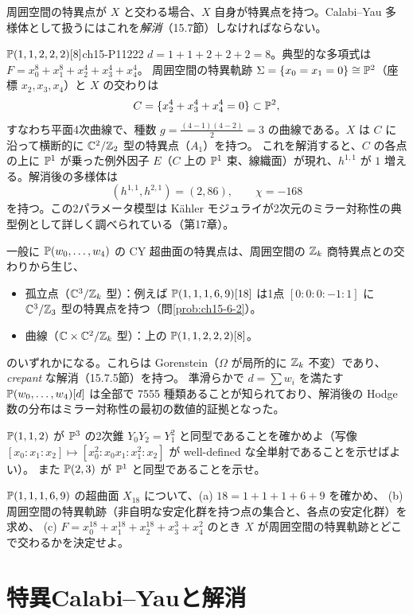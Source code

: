 周囲空間の特異点が $X$ と交わる場合、$X$ 自身が特異点を持つ。Calabi--Yau 多様体として扱うにはこれを\emph{解消}（15.7節）しなければならない。

\begin{myex}{$\mathbb{P}(1,1,2,2,2)[8]$}{ch15-P11222}
$d = 1+1+2+2+2 = 8$。典型的な多項式は $F = x_0^8+x_1^8+x_2^4+x_3^4+x_4^4$。
周囲空間の特異軌跡 $\Sigma = \{x_0=x_1=0\}\cong\mathbb{P}^2$（座標 $x_2,x_3,x_4$）と $X$ の交わりは
\[
C = \{x_2^4+x_3^4+x_4^4 = 0\}\subset\mathbb{P}^2,
\]
すなわち平面4次曲線で、種数 $g = \frac{(4-1)(4-2)}{2} = 3$ の曲線である。$X$ は $C$ に沿って横断的に $\mathbb{C}^2/\mathbb{Z}_2$ 型の特異点（$A_1$）を持つ。
これを解消すると、$C$ の各点の上に $\mathbb{P}^1$ が乗った例外因子 $E$（$C$ 上の $\mathbb{P}^1$ 束、線織面）が現れ、$h^{1,1}$ が $1$ 増える。解消後の多様体は
\[
(h^{1,1},h^{2,1}) = (2,86),\qquad\chi = -168
\]
を持つ。この2パラメータ模型は K\"ahler モジュライが2次元のミラー対称性の典型例として詳しく調べられている（第17章）。
\end{myex}

一般に $\mathbb{P}(w_0,\dots,w_4)$ の CY 超曲面の特異点は、周囲空間の $\mathbb{Z}_k$ 商特異点との交わりから生じ、
\begin{itemize}
\item 孤立点（$\mathbb{C}^3/\mathbb{Z}_k$ 型）：例えば $\mathbb{P}(1,1,1,6,9)[18]$ は1点 $[0:0:0:-1:1]$ に $\mathbb{C}^3/\mathbb{Z}_3$ 型の特異点を持つ（問\ref{prob:ch15-6-2}）。
\item 曲線（$\mathbb{C}\times\mathbb{C}^2/\mathbb{Z}_k$ 型）：上の $\mathbb{P}(1,1,2,2,2)[8]$。
\end{itemize}
のいずれかになる。これらは Gorenstein（$\Omega$ が局所的に $\mathbb{Z}_k$ 不変）であり、\emph{crepant} な解消（15.7.5節）を持つ。
準滑らかで $d = \sum w_i$ を満たす $\mathbb{P}(w_0,\dots,w_4)[d]$ は全部で 7555 種類あることが知られており、解消後の Hodge 数の分布はミラー対称性の最初の数値的証拠となった。

$\mathbb{P}(1,1,2)$ が $\mathbb{P}^3$ の2次錐 $Y_0Y_2 = Y_1^2$ と同型であることを確かめよ（写像 $[x_0:x_1:x_2]\mapsto[x_0^2:x_0x_1:x_1^2:x_2]$ が well-defined な全単射であることを示せばよい）。
また $\mathbb{P}(2,3)$ が $\mathbb{P}^1$ と同型であることを示せ。

$\mathbb{P}(1,1,1,6,9)$ の超曲面 $X_{18}$ について、(a) $18 = 1+1+1+6+9$ を確かめ、
(b) 周囲空間の特異軌跡（非自明な安定化群を持つ点の集合と、各点の安定化群）を求め、
(c) $F = x_0^{18}+x_1^{18}+x_2^{18}+x_3^3+x_4^2$ のとき $X$ が周囲空間の特異軌跡とどこで交わるかを決定せよ。

\section{特異Calabi--Yauと解消}

